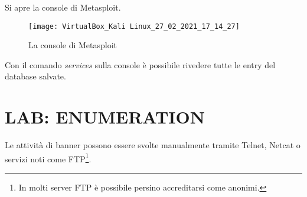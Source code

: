 \documentclass[14pt]{extreport}
\begin{document}
\vspace{5pt}



Si apre la console di Metasploit.


\begin{figure}[H]
    \centering
    \texttt{[image: VirtualBox\_Kali Linux\_27\_02\_2021\_17\_14\_27]}
    \caption{La console di Metasploit}
    \label{msfconsole}
\end{figure}

Con il comando \textit{services} sulla console è possibile rivedere tutte le entry del database salvate.







\chapter{LAB: ENUMERATION}


Le attività di banner possono essere svolte manualmente tramite Telnet, Netcat o servizi noti come FTP\footnote{In molti server FTP è possibile persino accreditarsi come anonimi.}.













\printbibliography

\end{document}
